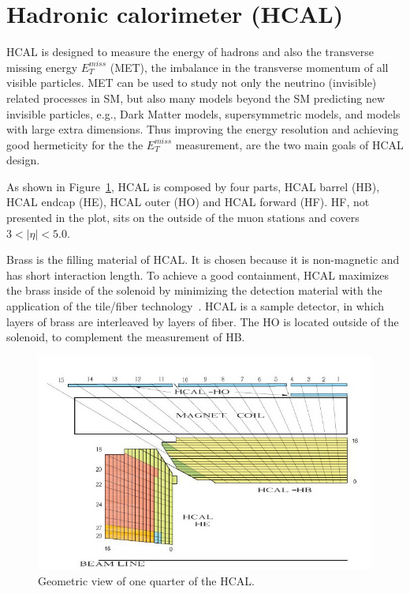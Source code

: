   \section{Hadronic calorimeter (HCAL)}
  
HCAL is designed to measure the energy of hadrons and also the transverse
missing energy $E_{T}^{miss}$ (MET), the imbalance in the transverse momentum
of all visible particles.  
MET can be used to study not only the neutrino (invisible) related processes in SM, but also 
many models  beyond the SM predicting new invisible particles, e.g., Dark Matter models, supersymmetric models, and models with large extra dimensions.    
 Thus improving the energy resolution and achieving good hermeticity for
the the $E_{T}^{miss}$ measurement, are the two main goals of HCAL design. 
 
As shown in Figure~\ref{figs:HCAL},  HCAL is composed by four parts, HCAL barrel (HB), HCAL endcap (HE), HCAL outer (HO) and HCAL forward (HF).  HF, not presented in the plot, sits on the outside of the muon stations and covers $3 <  |\eta| < 5.0$.  

Brass is the filling material of HCAL.  
It is chosen because it is non-magnetic and has short interaction length. To achieve a good containment, HCAL maximizes the brass inside of the solenoid by
minimizing the detection material with the application of the tile/fiber technology~\cite{expBook}. HCAL is a sample detector, in which layers of brass are interleaved by layers of fiber. 
The HO is located outside of the solenoid, to complement the measurement of HB. 

 
\begin{figure}
\centering
\includegraphics[width=.9\textwidth]{figures/Hcal.jpg}
\caption{Geometric view of one quarter of the HCAL.}
\label{figs:HCAL}
\end{figure}
  
